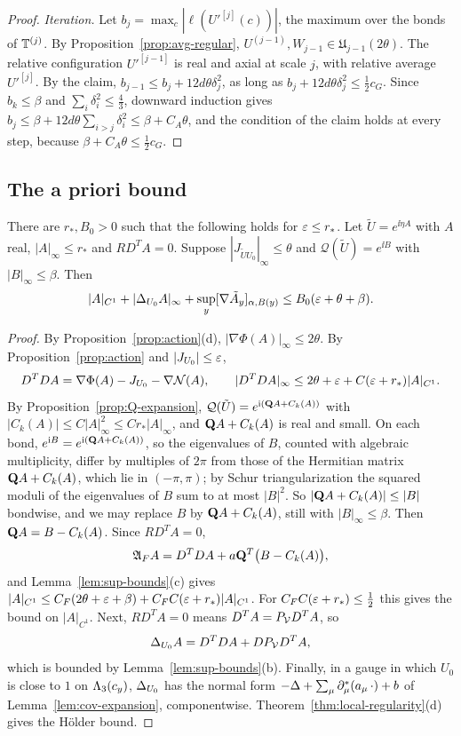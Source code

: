 \begin{proof}
\emph{Iteration.} Let $b_j=\max_c|\ell(U'^{[j]}(c))|$, the maximum over the bonds of $\mathbb T^{(j)}$. By Proposition~\ref{prop:avg-regular}, $U^{(j-1)},W_{j-1}\in\mathfrak U_{j-1}(2\theta)$. The relative configuration $U'^{[j-1]}$ is real and axial at scale $j$, with relative average $U'^{[j]}$. By the claim, $b_{j-1}\le b_j+12d\theta\delta_j^2$, as long as $b_j+12d\theta\delta_j^2\le\frac12c_G$. Since $b_k\le\beta$ and $\sum_i\delta_i^2\le\frac43$, downward induction gives $b_j\le\beta+12d\theta\sum_{i>j}\delta_i^2\le\beta+C_A\theta$, and the condition of the claim holds at every step, because $\beta+C_A\theta\le\frac12c_G$.
\end{proof}

\subsection{The a priori bound}

\begin{proposition}\label{prop:a-priori}
There are $r_*,B_0>0$ such that the following holds for $\varepsilon\le r_*$. Let $\tilde U=e^{\ii\eta A}$ with $A$ real, $|A|_\infty\le r_*$ and $R D^TA=0$. Suppose $|J_{\tilde UU_0}|_\infty\le\theta$ and $\mathcal Q(\tilde U)=e^{\ii B}$ with $|B|_\infty\le\beta$. Then
\[
|A|_{C^1}+|\Delta_{U_0}A|_\infty+\sup_y[\nabla\tilde A_y]_{\alpha,B(y)}\le B_0(\varepsilon+\theta+\beta).
\]
\end{proposition}

\begin{proof}
By Proposition~\ref{prop:action}(d), $|\nabla\Phi(A)|_\infty\le2\theta$. By Proposition~\ref{prop:action} and $|J_{U_0}|\le\varepsilon$,
\[
D^TDA=\nabla\Phi(A)-J_{U_0}-\nabla\mathcal N(A),\qquad|D^TDA|_\infty\le2\theta+\varepsilon+C(\varepsilon+r_*)|A|_{C^1}.
\]
By Proposition~\ref{prop:Q-expansion}, $\mathcal Q(\tilde U)=e^{\mathrm i(\mathbf Q A+C_k(A))}$ with $|C_k(A)|\le C|A|_\infty^2\le Cr_*|A|_\infty$, and $\mathbf Q A+C_k(A)$ is real and small. On each bond, $e^{\mathrm i B}=e^{\mathrm i(\mathbf Q A+C_k(A))}$, so the eigenvalues of $B$, counted with algebraic multiplicity, differ by multiples of $2\pi$ from those of the Hermitian matrix $\mathbf Q A+C_k(A)$, which lie in $(-\pi,\pi)$; by Schur triangularization the squared moduli of the eigenvalues of $B$ sum to at most $|B|^2$. So $|\mathbf Q A+C_k(A)|\le|B|$ bondwise, and we may replace $B$ by $\mathbf Q A+C_k(A)$, still with $|B|_\infty\le\beta$. Then $\mathbf Q A=B-C_k(A)$. Since $RD^TA=0$,
\[
\mathfrak A_FA=D^TDA+a\mathbf Q^T\big(B-C_k(A)\big),
\]
and Lemma~\ref{lem:sup-bounds}(c) gives $|A|_{C^1}\le C_F(2\theta+\varepsilon+\beta)+C_FC(\varepsilon+r_*)|A|_{C^1}$. For $C_FC(\varepsilon+r_*)\le\frac12$ this gives the bound on $|A|_{C^1}$. Next, $RD^TA=0$ means $D^TA=P_\mathcal V D^TA$, so
\[
\Delta_{U_0}A=D^TDA+DP_\mathcal V D^TA,
\]
which is bounded by Lemma~\ref{lem:sup-bounds}(b). Finally, in a gauge in which $U_0$ is close to $1$ on $\Lambda_3(c_y)$, $\Delta_{U_0}$ has the normal form $-\Delta+\sum_\mu\partial^*_\mu(a_\mu\,\cdot)+b$ of Lemma~\ref{lem:cov-expansion}, componentwise. Theorem~\ref{thm:local-regularity}(d) gives the H\"older bound.
\end{proof}

